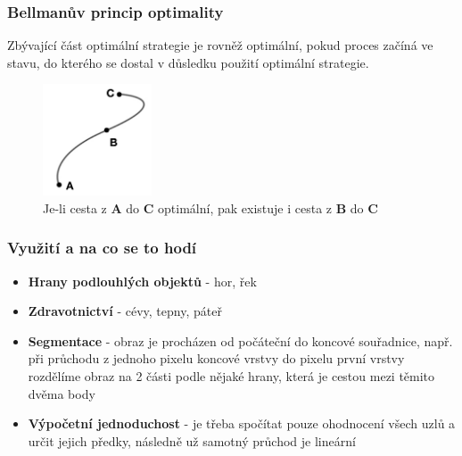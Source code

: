 \documentclass{beamer}
\begin{document}

	\begin{frame}[t,fragile]
		\frametitle{Bellmanův princip optimality}	

		Zbývající část optimální strategie je rovněž optimální, pokud proces začíná ve stavu, do kterého se dostal v důsledku použití optimální strategie.
			
		\begin{center}		
	\begin{figure}[h!]
	

	\includegraphics[height=33mm]{bellman-opt.pdf}
	\caption{\scriptsize{Je-li cesta z \textbf{A} do \textbf{C} optimální, pak existuje i cesta z \textbf{B} do \textbf{C}}}
		\end{figure}					  		
		\end{center}
	\end{frame}
	
	
	\begin{frame}[t,fragile]
		\frametitle{Využití a na co se to hodí}	

		\begin{itemize}
			\item \textbf{Hrany podlouhlých objektů} - hor, řek
			\item \textbf{Zdravotnictví} - cévy, tepny, páteř
			\item \textbf{Segmentace} - obraz je procházen od počáteční do koncové souřadnice, např. při průchodu z jednoho pixelu koncové vrstvy do pixelu první vrstvy rozdělíme obraz na 2 části podle nějaké hrany, která je cestou mezi těmito dvěma body
			\item \textbf{Výpočetní jednoduchost} - je třeba spočítat pouze ohodnocení všech uzlů a určit jejich předky, následně už samotný průchod je lineární
		\end{itemize}
		
	\end{frame}
	
\end{document}
